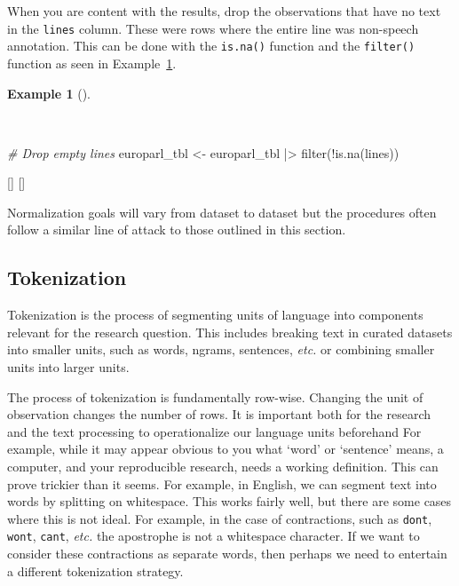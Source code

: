 \documentclass[
  letterpaper,
  krantz1]{latex/krantz-mod}
\newenvironment{Shaded}{\begin{snugshade}}{\end{snugshade}}
\newcommand{\CommentTok}[1]{\textcolor[rgb]{0.00,0.00,0.00}{\textit{#1}}}
\newcommand{\FunctionTok}[1]{\textcolor[rgb]{0.00,0.00,0.00}{#1}}
\newcommand{\NormalTok}[1]{\textcolor[rgb]{0.00,0.00,0.00}{#1}}
\newcommand{\OtherTok}[1]{\textcolor[rgb]{0.00,0.00,0.00}{#1}}
\newcommand{\SpecialCharTok}[1]{\textcolor[rgb]{0.00,0.00,0.00}{#1}}
\newcommand{\cindex}[1]{%
  \StrSubstitute{#1}{_}{\_}[\temp]%
  \index{\temp}%
}
\theoremstyle{definition}
\theoremstyle{definition}
\newtheorem{example}{Example}[chapter]
\theoremstyle{remark}
\begin{document}
When you are content with the results, drop the observations that have
no text in the \texttt{lines} column. These were rows where the entire
line was non-speech annotation. This can be done with the
\texttt{is.na()} function and the \texttt{filter()} function as seen in
Example~\ref{exm-transform-europarl-drop-empty-lines}.

\begin{example}[]\protect\hypertarget{exm-transform-europarl-drop-empty-lines}{}\label{exm-transform-europarl-drop-empty-lines}

~

\begin{Shaded}
\begin{Highlighting}[numbers=left,,]
\CommentTok{\# Drop empty lines}
\NormalTok{europarl\_tbl }\OtherTok{\textless{}{-}}
\NormalTok{  europarl\_tbl }\SpecialCharTok{|\textgreater{}}
  \FunctionTok{filter}\NormalTok{(}\SpecialCharTok{!}\FunctionTok{is.na}\NormalTok{(lines))}
\end{Highlighting}
\end{Shaded}

\cindex{filter()}\cindex{is.na()}

\end{example}

Normalization goals will vary from dataset to dataset but the procedures
often follow a similar line of attack to those outlined in this section.

\subsection{Tokenization}\label{sec-transform-tokenization}

Tokenization is the process of segmenting units of language into
components relevant for the research question. This includes breaking
text in curated datasets into smaller units, such as words, ngrams,
sentences, \emph{etc.} or combining smaller units into larger
units.

The process of tokenization is fundamentally row-wise. Changing the unit
of observation changes the number of rows. It
is important both for the research and the text processing to
operationalize our language units beforehand For
example, while it may appear obvious to you what `word' or `sentence'
means, a computer, and your reproducible research, needs a working
definition. This can prove trickier than it seems. For example, in
English, we can segment text into words by splitting on whitespace. This
works fairly well, but there are some cases where this is not ideal. For
example, in the case of contractions, such as
\texttt{don\textquotesingle{}t}, \texttt{won\textquotesingle{}t},
\texttt{can\textquotesingle{}t}, \emph{etc.} the apostrophe is not a
whitespace character. If we want to consider these contractions as
separate words, then perhaps we need to entertain a different
tokenization strategy.
\end{document}
